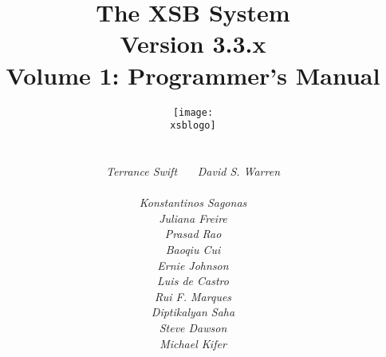 \documentclass[11pt]{report}
\newcommand{\version}{Version 3.3}
\newcommand{\xsblogo}{{xsb-logo}}
\begin{document}
\title{\bf The XSB System \\ \version .x\\ Volume 1: Programmer's Manual}

\author{{\texttt{[image: \\xsblogo]}}\\
        \ \\ \ \\
        {\em Terrance Swift} \ \ \ 
        {\em David S. Warren} \\ 
        \ \\
        {\em Konstantinos Sagonas} \\
        {\em Juliana Freire} \\
        {\em Prasad Rao} \\
        {\em Baoqiu Cui} \\
        {\em Ernie Johnson} \\
        {\em Luis de Castro} \\
        {\em Rui F. Marques} \\
        {\em Diptikalyan Saha} \\
        {\em Steve Dawson} \\
        {\em Michael Kifer} \\
        \ \\
} 

\maketitle

\thispagestyle{empty}


\newpage
\thispagestyle{empty}
\tableofcontents
\newpage        %
  


















\appendix



% 





\printindex
\printindex[pred]
\end{document}
